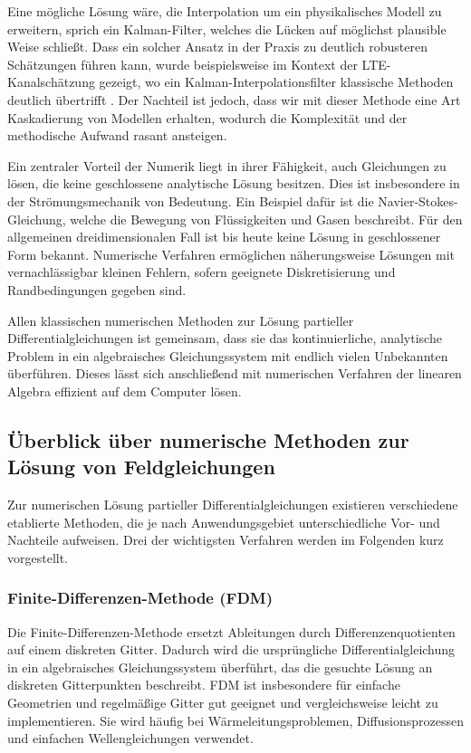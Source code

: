 Eine mögliche Lösung wäre, die Interpolation um ein physikalisches Modell zu erweitern, sprich ein Kalman-Filter, welches die Lücken auf möglichst plausible Weise schließt.
Dass ein solcher Ansatz in der Praxis zu deutlich robusteren Schätzungen führen kann, wurde beispielsweise im Kontext der LTE-Kanalschätzung gezeigt, wo ein Kalman-Interpolationsfilter klassische Methoden deutlich übertrifft \cite{parallelisierung:Dai2012}.
Der Nachteil ist jedoch, dass wir mit dieser Methode eine Art Kaskadierung von Modellen erhalten, wodurch die Komplexität und der methodische Aufwand rasant ansteigen.

Ein zentraler Vorteil der Numerik liegt in ihrer Fähigkeit, auch Gleichungen zu lösen, die keine geschlossene analytische Lösung besitzen.
Dies ist insbesondere in der Strömungsmechanik von Bedeutung.
Ein Beispiel dafür ist die Navier-Stokes-Gleichung, welche die Bewegung von Flüssigkeiten und Gasen beschreibt.
Für den allgemeinen dreidimensionalen Fall ist bis heute keine Lösung in geschlossener Form bekannt.
Numerische Verfahren ermöglichen näherungsweise Lösungen mit vernachlässigbar kleinen Fehlern, sofern geeignete Diskretisierung und Randbedingungen gegeben sind.

Allen klassischen numerischen Methoden zur Lösung partieller Differentialgleichungen ist gemeinsam, dass sie das kontinuierliche, analytische Problem in ein algebraisches Gleichungssystem mit endlich vielen Unbekannten überführen.
Dieses lässt sich anschließend mit numerischen Verfahren der linearen Algebra effizient auf dem Computer lösen.

\subsection{Überblick über numerische Methoden zur Lösung von Feldgleichungen}

Zur numerischen Lösung partieller Differentialgleichungen existieren verschiedene etablierte Methoden, die je nach Anwendungsgebiet unterschiedliche Vor- und Nachteile aufweisen.
Drei der wichtigsten Verfahren werden im Folgenden kurz vorgestellt.

\subsubsection{Finite-Differenzen-Methode (FDM)}
\label{parallelisierung:section:fdm}

Die Finite-Differenzen-Methode ersetzt Ableitungen durch Differenzenquotienten auf einem diskreten Gitter.
Dadurch wird die ursprüngliche Differentialgleichung in ein algebraisches Gleichungssystem überführt, das die gesuchte Lösung an diskreten Gitterpunkten beschreibt.
FDM ist insbesondere für einfache Geometrien und regelmäßige Gitter gut geeignet und vergleichsweise leicht zu implementieren.
Sie wird häufig bei Wärmeleitungsproblemen, Diffusionsprozessen und einfachen Wellengleichungen verwendet.

